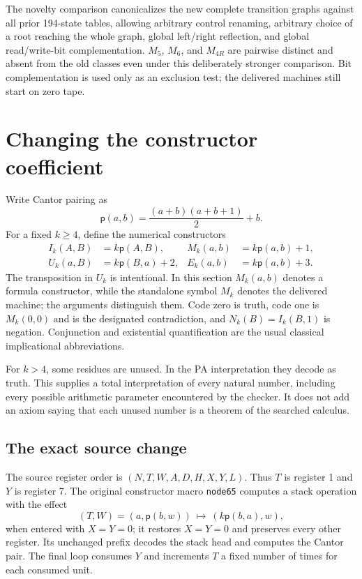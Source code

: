 \documentclass[10pt,letterpaper]{article}
\newcommand{\pair}{\mathsf p}
\newcommand{\file}[1]{\nolinkurl{#1}}
\begin{document}
The novelty comparison canonicalizes the new complete transition graphs against all prior 194-state tables, allowing arbitrary control renaming, arbitrary choice of a root reaching the whole graph, global left/right reflection, and global read/write-bit complementation. $M_5$, $M_6$, and $M_{4R}$ are pairwise distinct and absent from the old classes even under this deliberately stronger comparison. Bit complementation is used only as an exclusion test; the delivered machines still start on zero tape.

\section{Changing the constructor coefficient}
\label{sec:constructor}

Write Cantor pairing as
\[
 \pair(a,b)=\frac{(a+b)(a+b+1)}2+b.
\]
For a fixed $k\ge4$, define the numerical constructors
\begin{align*}
 I_k(A,B)&=k\pair(A,B), & M_k(a,b)&=k\pair(a,b)+1,\\
 U_k(a,B)&=k\pair(B,a)+2, & E_k(a,b)&=k\pair(a,b)+3.
\end{align*}
The transposition in $U_k$ is intentional. In this section $M_k(a,b)$ denotes a formula constructor, while the standalone symbol $M_k$ denotes the delivered machine; the arguments distinguish them. Code zero is truth, code one is $M_k(0,0)$ and is the designated contradiction, and $N_k(B)=I_k(B,1)$ is negation. Conjunction and existential quantification are the usual classical implicational abbreviations.

For $k>4$, some residues are unused. In the PA interpretation they decode as truth. This supplies a total interpretation of every natural number, including every possible arithmetic parameter encountered by the checker. It does not add an axiom saying that each unused number is a theorem of the searched calculus.

\subsection{The exact source change}

The source register order is $(N,T,W,A,D,H,X,Y,L)$. Thus $T$ is register 1 and $Y$ is register 7. The original constructor macro \file{node65} computes a stack operation with the effect
\[
 (T,W)=(a,\pair(b,w))\ \longmapsto\ (k\pair(b,a),w),
\]
when entered with $X=Y=0$; it restores $X=Y=0$ and preserves every other register. Its unchanged prefix decodes the stack head and computes the Cantor pair. The final loop consumes $Y$ and increments $T$ a fixed number of times for each consumed unit.
\end{document}
